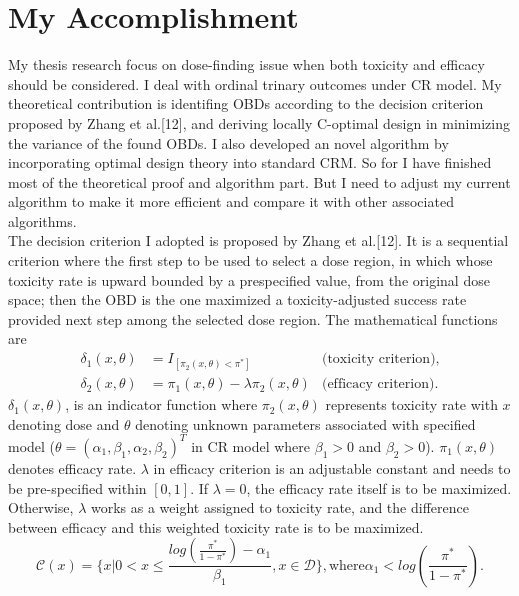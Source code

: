 \documentclass[12pt]{article}
\begin{document}
\section{My Accomplishment}
My thesis research focus on dose-finding issue when both toxicity and efficacy should be considered. I deal with ordinal trinary outcomes under CR model. My theoretical contribution is identifing OBDs according to the decision criterion proposed by Zhang et al.[12], and deriving locally C-optimal design in minimizing the variance of the found OBDs. I also developed an novel algorithm by incorporating optimal design theory into standard CRM. So for I have finished most of the theoretical proof and algorithm part. But I need to adjust my current algorithm to make it more efficient and compare it with other associated algorithms.\\
 The decision criterion I adopted is proposed by Zhang et al.[12]. It is a sequential criterion where the first step to be used to select a dose region, in which whose toxicity rate is upward bounded by a prespecified value, from the original dose space; then the OBD is the one maximized a toxicity-adjusted success rate provided next step among the selected dose region. The mathematical functions are
\begin{equation}
\begin{array}{rlr}
\delta_1(x, \theta)&=I_{[\pi_2(x,\theta)<\pi^*]}& \mbox{(toxicity criterion)},\\
\delta_2(x, \theta)&=\pi_1(x,\theta)-\lambda \pi_2(x,\theta)& \mbox{(efficacy criterion)}.
\end{array}
\end{equation}
 $\delta_1(x,\theta)$, is an indicator function where $\pi_2(x,\theta)$ represents toxicity rate with $x$ denoting dose and $\theta$ denoting unknown parameters associated with specified model ($\theta=(\alpha_1, \beta_1, \alpha_2, \beta_2)^T$ in CR model where $\beta_1>0$ and $\beta_2>0$). $\pi_1(x,\theta)$ denotes efficacy rate. $\lambda$ in efficacy criterion is an adjustable constant and needs to be pre-specified within $[0, 1]$. If $\lambda=0$, the efficacy rate itself is to be maximized. Otherwise, $\lambda$ works as a weight assigned to toxicity rate, and the difference between efficacy and this weighted toxicity rate is to be maximized.
\begin{equation}
    \mathcal{C}(x)=\{x| 0< x\le \frac{log(\frac{\pi^*}{1-\pi^*})-\alpha_1}{\beta_1}, x \in \mathcal{D} \}, \mbox{where}  \alpha_1 < log\left(\frac{\pi^*}{1-\pi^*}\right).
\end{equation}
\end{document}
